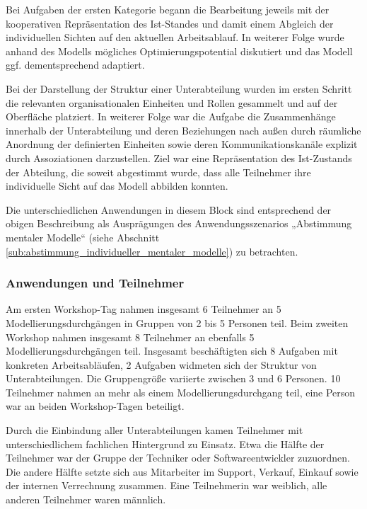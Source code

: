 Bei Aufgaben der ersten Kategorie begann die Bearbeitung jeweils mit der kooperativen Repräsentation des Ist-Standes und damit einem Abgleich der individuellen Sichten auf den aktuellen Arbeitsablauf. In weiterer Folge wurde anhand des Modells mögliches Optimierungspotential diskutiert und das Modell ggf. dementsprechend adaptiert.

Bei der Darstellung der Struktur einer Unterabteilung wurden im ersten Schritt die relevanten organisationalen Einheiten und Rollen gesammelt und auf der Oberfläche platziert. In weiterer Folge war die Aufgabe die Zusammenhänge innerhalb der Unterabteilung und deren Beziehungen nach außen durch räumliche Anordnung der definierten Einheiten sowie deren Kommunikationskanäle explizit durch Assoziationen darzustellen. Ziel war eine Repräsentation des Ist-Zustands der Abteilung, die soweit abgestimmt wurde, dass alle Teilnehmer ihre individuelle Sicht auf das Modell abbilden konnten.

Die unterschiedlichen Anwendungen in diesem Block sind entsprechend der obigen Beschreibung als Ausprägungen des Anwendungsszenarios „Abstimmung mentaler Modelle“ (siehe Abschnitt \ref{sub:abstimmung_individueller_mentaler_modelle}) zu betrachten.

\subsubsection{Anwendungen und Teilnehmer} %
\label{ssub:4_teilnehmer}

Am ersten Workshop-Tag nahmen insgesamt 6 Teilnehmer an 5 Modellierungsdurchgängen in Gruppen von 2 bis 5 Personen teil. Beim zweiten Workshop nahmen insgesamt 8 Teilnehmer an ebenfalls 5 Modellierungsdurchgängen teil. Insgesamt beschäftigten sich 8 Aufgaben mit konkreten Arbeitsabläufen, 2 Aufgaben widmeten sich der Struktur von Unterabteilungen. Die Gruppengröße variierte zwischen 3 und 6 Personen. 10 Teilnehmer nahmen an mehr als einem Modellierungsdurchgang teil, eine Person war an beiden Workshop-Tagen beteiligt.

Durch die Einbindung aller Unterabteilungen kamen Teilnehmer mit unterschiedlichem fachlichen Hintergrund zu Einsatz. Etwa die Hälfte der Teilnehmer war der Gruppe der Techniker oder Softwareentwickler zuzuordnen. Die andere Hälfte setzte sich aus Mitarbeiter im Support, Verkauf, Einkauf sowie der internen Verrechnung zusammen. Eine Teilnehmerin war weiblich, alle anderen Teilnehmer waren männlich.

